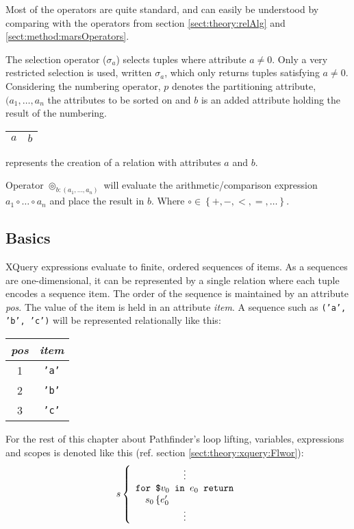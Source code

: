 Most of the operators are quite standard, and can easily be understood by comparing with the operators from
section \ref{sect:theory:relAlg} and \ref{sect:method:marsOperators}.

The selection operator ($\sigma_{a}$) selects tuples where attribute $a \ne 0$. Only a very restricted selection
is used, written $\sigma_{a}$, which only returns tuples satisfying $a \neq 0$.  Considering the numbering
operator, $p$ denotes the partitioning attribute, $(a_{1},\ldots,a_{n}$ the attributes to be sorted on and $b$ is
an added attribute holding the result of the
numbering. {\scriptsize{\begin{tabular}{c|c}$a$&$b$\\\hline\end{tabular}}}  represents the creation
of a relation with attributes $a$ and $b$.

Operator $\circledcirc_{b:(a_{1},\ldots,a_{n})}$ will evaluate the arithmetic/comparison expression $a_{1} \circ
\ldots \circ a_{n}$ and place the result in $b$. Where $\circ \in \left\{ +,- , <, =, \ldots  \right\} $.


\subsection{Basics}
\label{sect:translation:ll:Basics}
XQuery expressions evaluate to finite, ordered sequences of items. As a sequences are one-dimensional, it can be
represented by a single relation where each tuple encodes a sequence item. The order of the sequence is
maintained by an attribute \textit{pos}. The value of the item is held in an attribute \textit{item}. A sequence
such as \texttt{('a', 'b', 'c')} will be represented relationally like this:

\begin{center}
\begin{tabular}{|c|c|}\hline
\textit{pos}	& \textit{item} 	\\ \hline
1				& \texttt{'a'}		\\ \hline
2				& \texttt{'b'}		\\ \hline
3				& \texttt{'c'}		\\ \hline
\end{tabular}
\end{center}

For the rest of this chapter about Pathfinder's loop lifting, variables, expressions and scopes is denoted like
this (ref. section \ref{sect:theory:xquery:Flwor}):
\[
s \left\{
\begin{array}{l}
\qquad \qquad \quad \vdots \\
\mbox{\texttt{for \$}}v_{0}\mbox{\texttt{ in }} e_{0} \mbox{\texttt{ return}} \\
\quad s_{0} \left\{ e_{0}' \right. \\
\qquad \qquad \quad \vdots
\end{array}
\right.
\]

